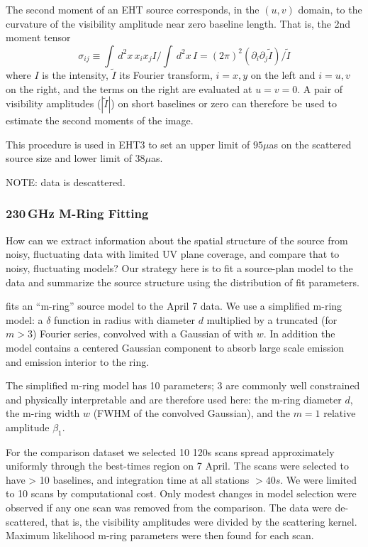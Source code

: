 
The second moment of an EHT source corresponds, in the $(u,v)$ domain, to
the curvature of the visibility amplitude near zero baseline length.
That is, the 2nd moment tensor
\begin{equation}
    \sigma_{ij} \equiv \int \, d^2x\, x_i x_j I/\int \, d^2x \, I = (2\pi)^2 \left(\partial_i \partial_j \tilde{I}\right)/\tilde{I}
\end{equation}
where $I$ is the intensity, $\tilde{I}$ its Fourier transform, $i =
x,y$ on the left and $i = u,v$ on the right, and the terms on the
right are evaluated at $u = v = 0$.
A pair of visibility amplitudes ($|\tilde{I}|$) on short baselines or
zero can therefore be used to estimate the second moments of the
image.

This procedure is used in EHT3  to set an upper limit of $95\mu$as on
the scattered source size and lower limit of $38\mu$as.

NOTE: data is descattered.

\subsubsection{230\,GHz M-Ring Fitting}

How can we extract information about the spatial structure of the source from noisy, fluctuating data with limited UV plane coverage, and compare that to noisy, fluctuating models? Our strategy here is to fit a source-plan model to the data and summarize the source structure using the distribution of fit parameters.  

 fits an ``m-ring'' source model to the April 7 data.  We use a simplified m-ring model: a $\delta$ function in radius with diameter $d$ multiplied by a truncated (for $m > 3$) Fourier series, convolved with a Gaussian of with $w$.  In addition the model contains a centered Gaussian component to absorb large scale emission and emission interior to the ring.

The simplified m-ring model has 10 parameters; 3 are commonly well constrained and physically interpretable and are therefore used here: the m-ring diameter $d$, the m-ring width $w$ (FWHM of the convolved Gaussian), and the $m=1$ relative amplitude $\beta_1$.

For the comparison dataset we selected 10 120s scans spread approximately uniformly through the best-times region on 7 April.  The scans were selected to have > 10 baselines, and integration time at all stations $> 40s$.  We were limited to 10 scans by computational cost.   Only modest changes in model selection were observed if any one scan was removed from the comparison.  The data were de-scattered, that is, the visibility amplitudes were divided by the scattering kernel.  Maximum likelihood m-ring parameters were then found for each scan.

